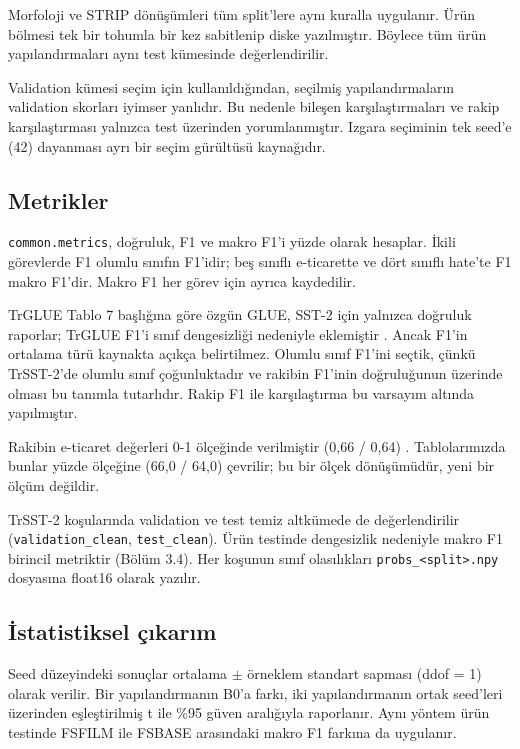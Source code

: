 \documentclass[11pt]{article}
\begin{document}
Morfoloji ve STRIP dönüşümleri tüm split'lere aynı kuralla uygulanır. Ürün bölmesi tek bir tohumla bir kez sabitlenip diske yazılmıştır. Böylece tüm ürün yapılandırmaları aynı test kümesinde değerlendirilir.

Validation kümesi seçim için kullanıldığından, seçilmiş yapılandırmaların validation skorları iyimser yanlıdır. Bu nedenle bileşen karşılaştırmaları ve rakip karşılaştırması yalnızca test üzerinden yorumlanmıştır. Izgara seçiminin tek seed'e (42) dayanması ayrı bir seçim gürültüsü kaynağıdır.

\subsection{Metrikler}

\texttt{common.\allowbreak{}\allowbreak{}metrics}, doğruluk, F1 ve makro F1'i yüzde olarak hesaplar. İkili görevlerde F1 olumlu sınıfın F1'idir; beş sınıflı e-ticarette ve dört sınıflı hate'te F1 makro F1'dir. Makro F1 her görev için ayrıca kaydedilir.

TrGLUE Tablo 7 başlığına göre özgün GLUE, SST-2 için yalnızca doğruluk raporlar; TrGLUE F1'i sınıf dengesizliği nedeniyle eklemiştir \citep{altinok2025,wang2018}. Ancak F1'in ortalama türü kaynakta açıkça belirtilmez. Olumlu sınıf F1'ini seçtik, çünkü TrSST-2'de olumlu sınıf çoğunluktadır ve rakibin F1'inin doğruluğunun üzerinde olması bu tanımla tutarlıdır. Rakip F1 ile karşılaştırma bu varsayım altında yapılmıştır.

Rakibin e-ticaret değerleri 0-1 ölçeğinde verilmiştir (0,66 / 0,64) \citep{altinok2025}. Tablolarımızda bunlar yüzde ölçeğine (66,0 / 64,0) çevrilir; bu bir ölçek dönüşümüdür, yeni bir ölçüm değildir.

TrSST-2 koşularında validation ve test temiz altkümede de değerlendirilir (\texttt{validation\_\allowbreak{}\allowbreak{}clean}, \texttt{test\_\allowbreak{}\allowbreak{}clean}). Ürün testinde dengesizlik nedeniyle makro F1 birincil metriktir (Bölüm 3.4). Her koşunun sınıf olasılıkları \texttt{probs\_\allowbreak{}\allowbreak{}<split>.\allowbreak{}\allowbreak{}npy} dosyasına float16 olarak yazılır.

\subsection{İstatistiksel çıkarım}

Seed düzeyindeki sonuçlar ortalama $\pm$ örneklem standart sapması (ddof = 1) olarak verilir. Bir yapılandırmanın B0'a farkı, iki yapılandırmanın ortak seed'leri üzerinden eşleştirilmiş t ile \%95 güven aralığıyla raporlanır. Aynı yöntem ürün testinde FSFILM ile FSBASE arasındaki makro F1 farkına da uygulanır.
\end{document}

